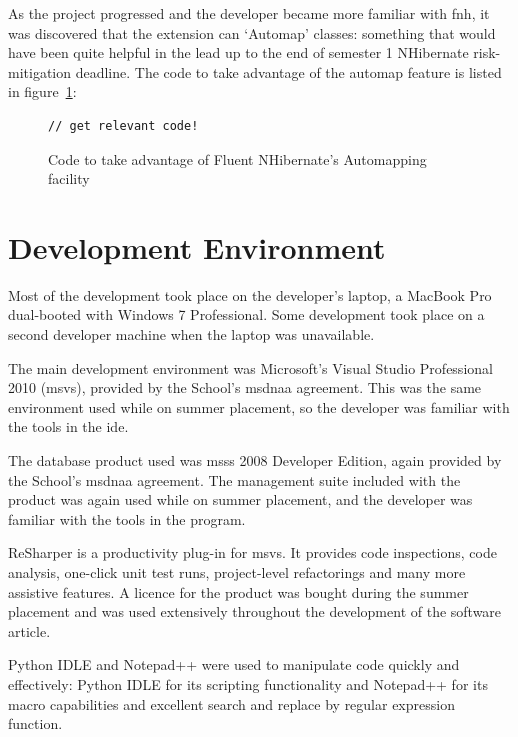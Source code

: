 As the project progressed and the developer became more familiar with \gls{fnh}, it was discovered that the extension can `Automap' classes: something that would have been quite helpful in the lead up to the end of semester 1 NHibernate risk-mitigation deadline.
The code to take advantage of the automap feature is listed in figure~\ref{fig:fnhCode}:

\revisit

\begin{figure}
	\begin{center}
			\lstset{language=CSharp} 
			\begin{lstlisting}
// get relevant code!
			\end{lstlisting}
		\caption{Code to take advantage of Fluent NHibernate's Automapping facility}
		\label{fig:fnhCode}
	\end{center}
\end{figure}

\section{Development Environment}
\label{devEnv}
Most of the development took place on the developer's laptop, a MacBook Pro dual-booted with Windows 7 Professional.  Some development took place on a second developer machine when the laptop was unavailable.

The main development environment was Microsoft's Visual Studio Professional 2010 (\gls{msvs}), provided by the School's \gls{msdnaa} agreement.  This was the same environment used while on summer placement, so the developer was familiar with the tools in the \gls{ide}.

The database product used was \gls{msss} 2008 Developer Edition, again provided by the School's \gls{msdnaa} agreement. The management suite included with the product was again used while on summer placement, and the developer was familiar with the tools in the program.

ReSharper is a productivity plug-in for \gls{msvs}.  It provides code inspections, code analysis, one-click unit test runs, project-level refactorings and many more assistive features. A licence for the product was bought during the summer placement and was used extensively throughout the development of the software article.

Python IDLE and Notepad++ were used to manipulate code quickly and effectively: Python IDLE for its scripting functionality and Notepad++ for its macro capabilities and excellent search and replace by regular expression function.

